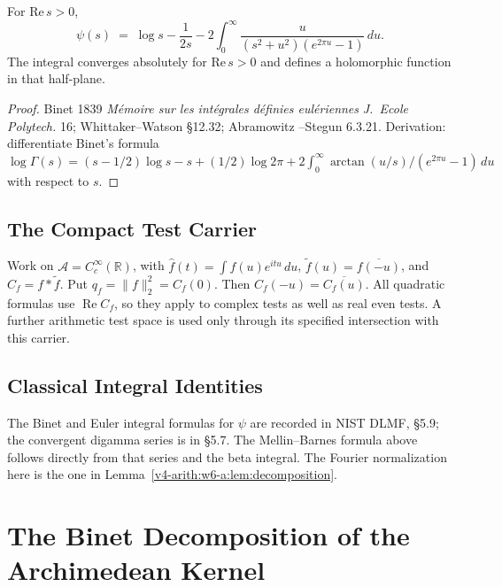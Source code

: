 \begin{proposition}
\label{v4-arith:w7-f:prop:binet}
For \(\mathrm{Re}\,s>0\),
\begin{equation}
\label{v4-arith:w7-f:eq:binet}
\psi(s)\;=\;\log s-\frac{1}{2s}-2\!\int_{0}^{\infty}\!\frac{u}{(s^{2}+u^{2})(e^{2\pi u}-1)}\,du.
\end{equation}
The integral converges absolutely for \(\mathrm{Re}\,s>0\) and defines
a holomorphic function in that half-plane.
\end{proposition}

\begin{proof}
Binet 1839 \emph{M\'emoire sur les int\'egrales d\'efinies eul\'eriennes}
\emph{J.~Ecole Polytech.} 16; Whittaker--Watson \S12.32; Abramowitz
--Stegun 6.3.21. Derivation: differentiate Binet's formula
\(\log\Gamma(s)=(s-1/2)\log s-s+(1/2)\log 2\pi+2\int_{0}^{\infty}\arctan(u/s)/(e^{2\pi u}-1)\,du\)
with respect to \(s\).
\end{proof}

\subsection{The Compact Test Carrier}
\label{v4-arith:w7-f:context:domain}
Work on \(\mathscr A=C_c^\infty(\mathbb R)\), with
\(\widehat f(t)=\int f(u)e^{itu}\,du\),
\(\widetilde f(u)=\overline{f(-u)}\), and
\(C_f=f*\widetilde f\). Put \(q_f=\|f\|_2^2=C_f(0)\).
Then \(C_f(-u)=\overline{C_f(u)}\). All quadratic formulas use
\(\operatorname{Re}C_f\), so they apply to complex tests as well as
real even tests. A further arithmetic test space is used only through
its specified intersection with this carrier.

\subsection{Classical Integral Identities}
\label{v4-arith:w7-f:context:sources}
The Binet and Euler integral formulas for \(\psi\) are recorded in
NIST DLMF, \S5.9; the convergent digamma series is in \S5.7.
The Mellin--Barnes formula above follows directly from that series
and the beta integral. The Fourier normalization here is the one in
Lemma~\ref{v4-arith:w6-a:lem:decomposition}.

\section{The Binet Decomposition of the Archimedean Kernel}
\label{v4-arith:w7-f:binet-decomposition}


